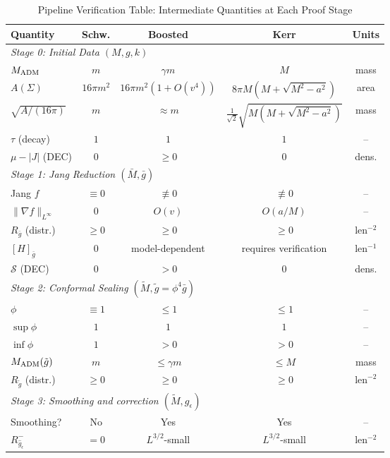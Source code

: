 \begin{table}[ht]
\centering
\caption{Pipeline Verification Table: Intermediate Quantities at Each Proof Stage}
\label{tab:PipelineVerification}
\renewcommand{\arraystretch}{1.2}
\footnotesize
\begin{tabular}{|p{3.2cm}|c|c|c|c|}
\hline
\textbf{Quantity} & \textbf{Schw.} & \textbf{Boosted} & \textbf{Kerr} & \textbf{Units} \\
\hline
\multicolumn{5}{|l|}{\textit{Stage 0: Initial Data $(M,g,k)$}} \\
\hline
$M_{\mathrm{ADM}}$ & $m$ & $\gamma m$ & $M$ & mass \\
$A(\Sigma)$ & $16\pi m^2$ & $16\pi m^2(1+O(v^4))$ & $8\pi M(M+\sqrt{M^2-a^2})$ & area \\
$\sqrt{A/(16\pi)}$ & $m$ & $\approx m$ & $\frac{1}{\sqrt{2}}\sqrt{M(M+\sqrt{M^2-a^2})}$ & mass \\
$\tau$ (decay) & $1$ & $1$ & $1$ & -- \\
$\mu - |J|$ (DEC) & $0$ & $\ge 0$ & $0$ & dens. \\
\hline
\multicolumn{5}{|l|}{\textit{Stage 1: Jang Reduction $(\bar{M}, \bar{g})$}} \\
\hline
Jang $f$ & $\equiv 0$ & $\not\equiv 0$ & $\not\equiv 0$ & -- \\
$\|\nabla f\|_{L^\infty}$ & $0$ & $O(v)$ & $O(a/M)$ & -- \\
$R_{\bar{g}}$ (distr.) & $\ge 0$ & $\ge 0$ & $\ge 0$ & len$^{-2}$ \\
$[H]_{\bar{g}}$ & $0$ & model-dependent & requires verification & len$^{-1}$ \\
$\mathcal{S}$ (DEC) & $0$ & $> 0$ & $0$ & dens. \\
\hline
\multicolumn{5}{|l|}{\textit{Stage 2: Conformal Sealing $(\tilde{M}, \tilde{g} = \phi^4\bar{g})$}} \\
\hline
$\phi$ & $\equiv 1$ & $\le 1$ & $\le 1$ & -- \\
$\sup \phi$ & $1$ & $1$ & $1$ & -- \\
$\inf \phi$ & $1$ & $> 0$ & $> 0$ & -- \\
$M_{\mathrm{ADM}}(\tilde{g})$ & $m$ & $\le \gamma m$ & $\le M$ & mass \\
$R_{\tilde{g}}$ (distr.) & $\ge 0$ & $\ge 0$ & $\ge 0$ & len$^{-2}$ \\
\hline
\multicolumn{5}{|l|}{\textit{Stage 3: Smoothing and correction $(\tilde{M}, g_\epsilon)$}} \\
\hline
Smoothing? & No & Yes & Yes & -- \\
$R_{\hat{g}_\epsilon}^-$ & $=0$ & $L^{3/2}$-small & $L^{3/2}$-small & len$^{-2}$ \\

\end{tabular}
\end{table}
